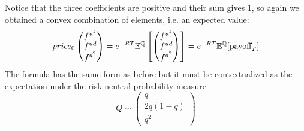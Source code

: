 Notice that the three coefficients are positive and their sum gives 1, so again we obtained a convex combination of elements, i.e. an expected value:
\begin{equation}
    price_0
    \left(
    \begin{matrix}
        f^{u^2} \\ f^{ud} \\ f^{d^2}
    \end{matrix}
    \right) 
    = e^{-RT} \mathbb{E}^{\mathbb{Q}}
    \left[ 
    \left(
    \begin{matrix}
        f^{u^2} \\ f^{ud} \\ f^{d^2}
    \end{matrix}
    \right)
    \right] 
    = e^{-RT}\mathbb{E}^{\mathbb{Q}}[\mbox{payoff}_T]
\end{equation}
The formula has the same form as before but it must be contextualized as the expectation under the risk neutral probability measure 
\begin{equation}
    Q \sim 
    \left(
    \begin{matrix}
        q \\ 2q(1-q) \\ q^2
    \end{matrix}
    \right)
\end{equation}

